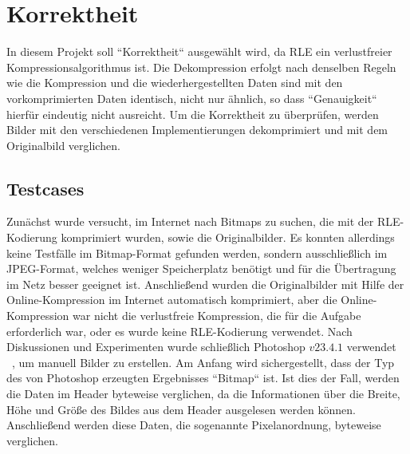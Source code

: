 \documentclass[course=erap]{aspdoc}
\begin{document}


    \section{Korrektheit}\label{sec:korrektheit}
    In diesem Projekt soll ``Korrektheit`` ausgewählt wird,
    da RLE ein verlustfreier Kompressionsalgorithmus ist.
    Die Dekompression erfolgt nach denselben Regeln wie die Kompression und die wiederhergestellten Daten sind mit
    den vorkomprimierten Daten identisch, nicht nur ähnlich, so dass ``Genauigkeit`` hierfür eindeutig nicht ausreicht.
    \newline
    \newline
    Um die Korrektheit zu überprüfen, werden Bilder mit den verschiedenen Implementierungen dekomprimiert und mit dem
    Originalbild verglichen.

    \subsection{Testcases}\label{subsec:testcases}
    Zunächst wurde versucht, im Internet nach Bitmaps zu suchen, die mit der RLE-Kodierung komprimiert wurden, sowie
    die Originalbilder.
    Es konnten allerdings keine Testfälle im Bitmap-Format gefunden werden, sondern ausschließlich im JPEG-Format,
    welches weniger Speicherplatz benötigt und für die Übertragung im Netz besser geeignet ist.
    \newline
    \newline
    Anschließend wurden die Originalbilder mit Hilfe der Online-Kompression im Internet automatisch komprimiert, aber
    die Online-Kompression war nicht die verlustfreie Kompression, die für die Aufgabe erforderlich war, oder es wurde
    keine RLE-Kodierung verwendet.
    \newline
    \newline
    Nach Diskussionen und Experimenten wurde schließlich Photoshop $v23.4.1$ verwendet \ \cite{bmpExtension}, um
    manuell Bilder zu erstellen.
    \newline
    \newline
    Am Anfang wird sichergestellt, dass der Typ des von Photoshop erzeugten Ergebnisses ``Bitmap`` ist.
    Ist dies der Fall, werden die Daten im Header byteweise verglichen, da die Informationen über die Breite, Höhe und
    Größe des Bildes aus dem Header ausgelesen werden können.
    Anschließend werden diese Daten, die sogenannte Pixelanordnung, byteweise verglichen. \ \cite{bitmapStorage}
\end{document}
